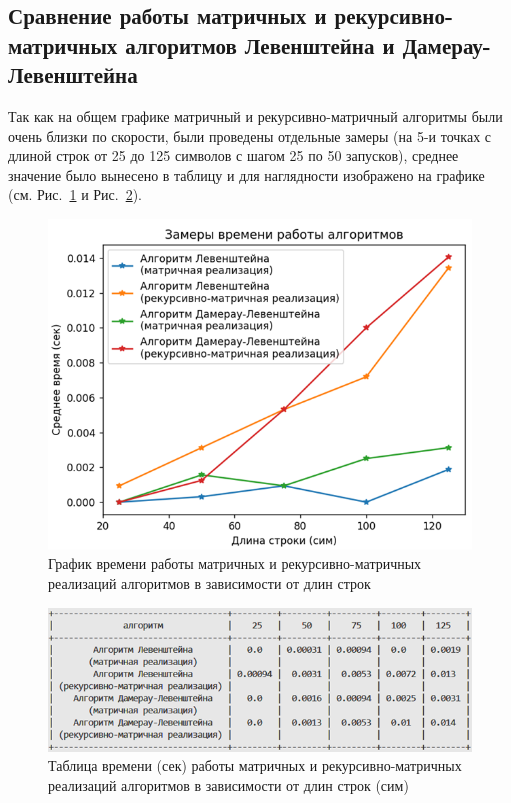 \subsection{Сравнение работы матричных и рекурсивно-матричных алгоритмов Левенштейна и Дамерау-Левенштейна}

\hspace{1.25cm}
Так как на общем графике матричный и рекурсивно-матричный алгоритмы были очень близки по скорости, были проведены отдельные замеры (на 5-и точках с длиной строк от 25 до 125 символов с шагом 25 по 50 запусков), среднее значение было вынесено в таблицу и для наглядности изображено на графике (см. Рис.~\ref{fig:graph_mat_rec-mat} и Рис.~\ref{fig:table_mat_rec-mat}).

\begin{figure}[H]
    \centering
    \includegraphics[width=1\textwidth]{img/graph_mat_rec-mat.png}
    \caption{График времени работы матричных и рекурсивно-матричных реализаций алгоритмов в зависимости от длин строк}
    \label{fig:graph_mat_rec-mat}
\end{figure}

\begin{figure}[H]
    \centering
    \includegraphics[width=1\textwidth]{img/table_mat_rec-mat.png}
    \caption{Таблица времени (сек) работы матричных и рекурсивно-матричных реализаций алгоритмов в зависимости от длин строк (сим)}
    \label{fig:table_mat_rec-mat}
\end{figure}

